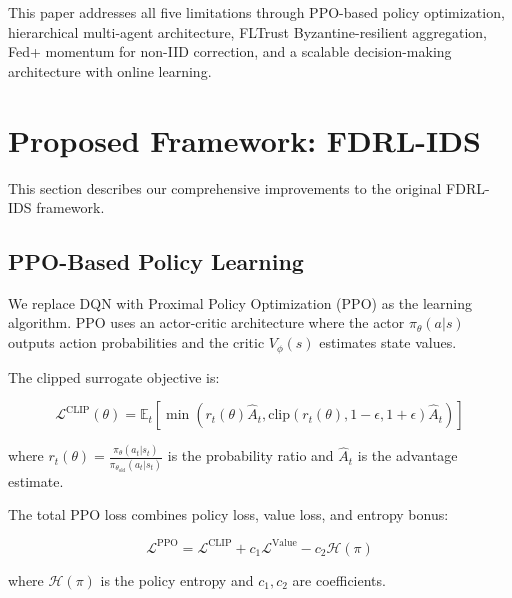 \documentclass[conference]{IEEEtran}
\begin{document}
This paper addresses all five limitations through PPO-based policy optimization, hierarchical multi-agent architecture, FLTrust Byzantine-resilient aggregation, Fed+ momentum for non-IID correction, and a scalable decision-making architecture with online learning.

\section{Proposed Framework: FDRL-IDS}

This section describes our comprehensive improvements to the original FDRL-IDS framework.

\subsection{PPO-Based Policy Learning}

We replace DQN with Proximal Policy Optimization (PPO) as the learning algorithm. PPO uses an actor-critic architecture where the actor $\pi_\theta(a|s)$ outputs action probabilities and the critic $V_\phi(s)$ estimates state values.

The clipped surrogate objective is:

\begin{equation}
\mathcal{L}^{\text{CLIP}}(\theta) = \mathbb{E}_t \left[ \min\left( r_t(\theta) \hat{A}_t, \text{clip}(r_t(\theta), 1-\epsilon, 1+\epsilon) \hat{A}_t \right) \right]
\end{equation}

where $r_t(\theta) = \frac{\pi_\theta(a_t|s_t)}{\pi_{\theta_{\text{old}}}(a_t|s_t)}$ is the probability ratio and $\hat{A}_t$ is the advantage estimate.

The total PPO loss combines policy loss, value loss, and entropy bonus:

\begin{equation}
\mathcal{L}^{\text{PPO}} = \mathcal{L}^{\text{CLIP}} + c_1 \mathcal{L}^{\text{Value}} - c_2 \mathcal{H}(\pi)
\end{equation}

where $\mathcal{H}(\pi)$ is the policy entropy and $c_1, c_2$ are coefficients.
\end{document}
